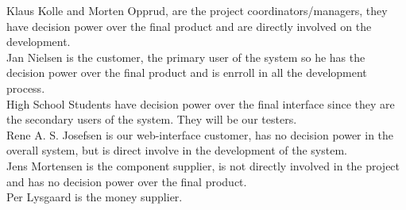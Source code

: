 Klaus Kolle and Morten Opprud, are the project coordinators/managers, they
have decision power over the final product and are directly involved on the
development.\\
\newline
Jan Nielsen is the customer, the primary user of the system so he has the
decision power over the final product and is enrroll in all the development
process.\\
\newline
High School Students have decision power over the final interface since they
are the secondary users of the system. They will be our testers.\\
\newline
Rene A. S. Josefsen is our web-interface customer, has no decision power in the
overall system, but is direct involve in the development of the system.\\
\newline
Jens Mortensen is the component supplier, is not directly involved in the
project and has no decision power over the final product.\\
\newline
Per Lysgaard is the money supplier.\\
